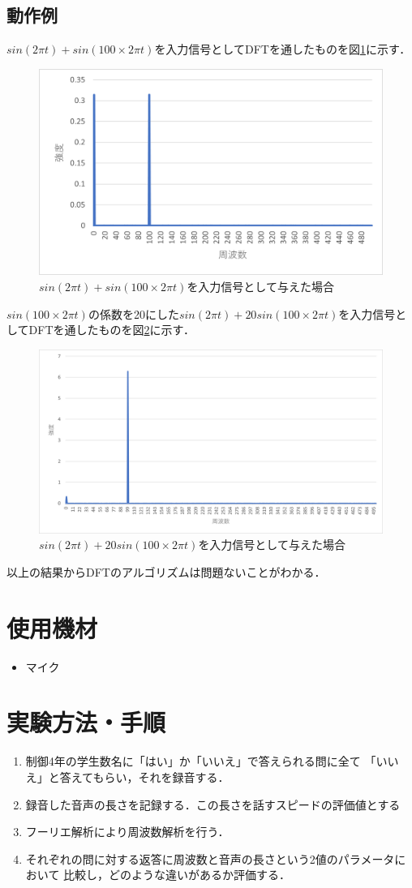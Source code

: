 \documentclass[titlepage]{jarticle}
\begin{document}
\subsection{動作例}
$sin( 2 \pi t)+sin(100 \times 2 \pi t)$を入力信号としてDFTを通したものを図\ref{1_100}に示す．
\begin{figure}[H]
  \centering
  \includegraphics[width=0.6\hsize]{img/1_100.png}
  \caption{$sin(2 \pi t)+sin(100 \times 2 \pi t)$を入力信号として与えた場合}
  \label{1_100}
\end{figure}

$sin(100 \times 2 \pi t)$の係数を20にした$sin(2 \pi t)+20sin(100 \times 2 \pi t)$を入力信号としてDFTを通したものを図\ref{1_20-100}に示す．
\begin{figure}[H]
  \centering
  \includegraphics[width=0.6\hsize]{img/1_20-100.png}
  \caption{$sin( 2 \pi t)+20sin(100 \times 2 \pi t)$を入力信号として与えた場合}
  \label{1_20-100}
\end{figure}
以上の結果からDFTのアルゴリズムは問題ないことがわかる．

\section{使用機材}
\begin{itemize}
  \item マイク
\end{itemize}

\section{実験方法・手順}
\begin{enumerate}
  \item 制御4年の学生数名に「はい」か「いいえ」で答えられる問に全て
        「いいえ」と答えてもらい，それを録音する．
  \item 録音した音声の長さを記録する．この長さを話すスピードの評価値とする
  \item フーリエ解析により周波数解析を行う．
  \item それぞれの問に対する返答に周波数と音声の長さという2値のパラメータにおいて
        比較し，どのような違いがあるか評価する．
\end{enumerate}
\end{document}
